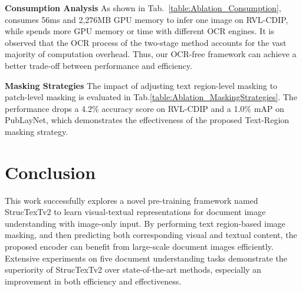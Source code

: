 \documentclass{article} \usepackage{iclr2023_conference,times}
\begin{document}
\noindent\textbf{Consumption Analysis} As shown in Tab.~\ref{table:Ablation_Consumption},  consumes 56ms and 2,276MB GPU memory to infer one image on RVL-CDIP, while  spends more GPU memory or time with different OCR engines. It is observed that the OCR process of the two-stage method accounts for the vast majority of computation overhead. Thus, our OCR-free framework can achieve a better trade-off between performance and efficiency.

\noindent\textbf{Masking Strategies} The impact of adjusting text region-level masking to patch-level masking is evaluated in Tab.\ref{table:Ablation_MaskingStrategies}. The performance drops a 4.2\% accuracy score on RVL-CDIP and a 1.0\% mAP on PubLayNet, which demonstrates the effectiveness of the proposed Text-Region masking strategy.

\begin{table}[ht]
\caption{Comparison between performance of different masking strategies on RVL-CDIP and PubLayNet. The model is only pre-trained with the MIM task.}
\label{table:Ablation_MaskingStrategies}
\vspace{-1em}
\begin{center}
\end{center}
\vspace{-1em}
\end{table}









\section{Conclusion}
This work successfully explores a novel pre-training framework named StrucTexTv2 to learn visual-textual representations for document image understanding with image-only input. By performing text region-based image masking, and then predicting both corresponding visual and textual content, the proposed encoder can benefit from large-scale document images efficiently. Extensive experiments on five document understanding tasks demonstrate the superiority of StrucTexTv2 over state-of-the-art methods, especially an improvement in both efficiency and effectiveness.
\end{document}
